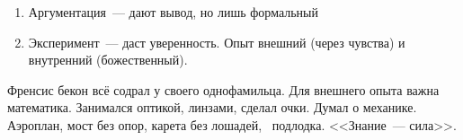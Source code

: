 \begin{enumerate}
	\item Аргументация~--- дают вывод, но лишь формальный
	\item Эксперимент~--- даст уверенность. Опыт внешний (через чувства) и внутренний (божественный).
\end{enumerate}
Френсис бекон всё содрал у своего однофамильца.
Для внешнего опыта важна математика. Занимался оптикой, линзами, сделал очки. Думал о механике. Аэроплан, мост без опор, карета без лошадей, ~подлодка. <<Знание~--- сила>>.
